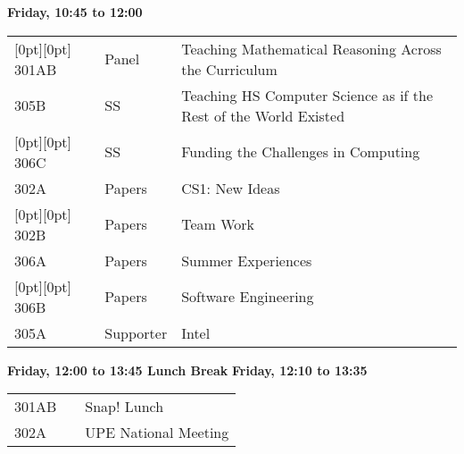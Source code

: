 \noindent
{\sffamily\bfseries Friday, 10:45 to 12:00}\newline\noindent
\begin{tabular*}{5in}{@{}p{0.5in}@{}p{0.75in}@{}p{3.75in}}
\rowcolor[gray]{0.9}[0pt][0pt] 301AB & Panel & Teaching Mathematical Reasoning Across the Curriculum \\

305B & SS & Teaching HS Computer Science as if the Rest of the World Existed \\

\rowcolor[gray]{0.9}[0pt][0pt] 306C & SS & Funding the Challenges in Computing \\

302A & Papers & CS1:  New Ideas \\

\rowcolor[gray]{0.9}[0pt][0pt] 302B & Papers & Team Work \\

306A & Papers & Summer Experiences \\

\rowcolor[gray]{0.9}[0pt][0pt] 306B & Papers & Software Engineering \\

305A & Supporter & Intel 
\end{tabular*}
{\sffamily\bfseries Friday, 12:00 to 13:45  Lunch Break}\newline\noindent
\noindent
{\sffamily\bfseries Friday, 12:10 to 13:35}\newline\noindent
\begin{tabular*}{5in}{@{}p{0.5in}@{}p{0.75in}@{}p{3.75in}}

301AB &  & Snap! Lunch \\

302A & & UPE National Meeting \\
\end{tabular*}


